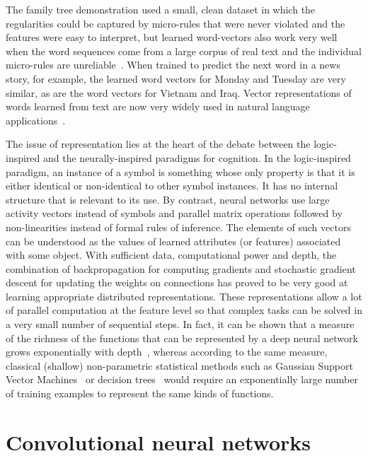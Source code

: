 \documentclass[]{article}
\begin{document}
The family tree demonstration used a small, clean dataset in which the
regularities could be captured by micro-rules that were never violated and
the features were easy to interpret, but learned word-vectors also work
very well when the word sequences come from a large corpus of real text and
the individual micro-rules are unreliable~\citep{BenDucVin01-short}. When trained to
predict the next word in a news story, for example, the learned word
vectors for Monday and Tuesday are very similar, as are the word vectors
for Vietnam and Iraq.  Vector representations of words learned from text
are now very widely used in natural language 
applications~\citep{Schwenk-2007,collobert:2011b,Socher-2011,Mikolov-et-al-NIPS2013}.

The issue of representation lies at the heart of the debate between the
logic-inspired and the neurally-inspired paradigms for cognition. In the
logic-inspired paradigm, an instance of a symbol is something whose only
property is that it is either identical or non-identical to other symbol
instances. It has no internal structure that is relevant to its use. By
contrast, neural networks use large activity vectors instead of symbols and
parallel matrix operations followed by non-linearities instead of formal
rules of inference. The elements of such vectors can be understood as
the values of learned attributes (or features) associated with some object. 
With sufficient data, computational power and depth,
the combination of backpropagation for computing gradients and stochastic
gradient descent for updating the weights on connections has proved to be
very good at learning appropriate distributed representations. These
representations allow a lot of parallel computation at the feature level so
that complex tasks can be solved in a very small number of sequential
steps. In fact, it can be shown that a measure of the richness of the functions
that can be represented by a deep neural network grows exponentially
with depth~\citep{Montufar-et-al-NIPS2014}, whereas according to the
same measure, classical (shallow) non-parametric statistical methods such as
Gaussian Support Vector Machines~\citep{Bengio-localfailure-NIPS-2006-small} 
or decision trees~\citep{Bengio-decision-trees10}
would require an exponentially large number
of training examples to represent the same kinds of functions.

\section{Convolutional neural networks}
\end{document}
